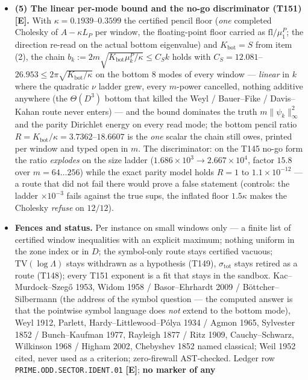 \documentclass[11pt]{article}
\providecommand{\mE}{\textbf{[E]}}\providecommand{\mC}{\textbf{[C]}}
\begin{document}
\begin{itemize}[leftmargin=1.5em]
violates the monotone shape on every window and the closed formula misses its minimum by
$\ge8.7\times10^{-2}$).
\item \textbf{(5) The linear per-mode bound and the no-go discriminator (T151) \mE.} With
$\kappa=0.1939$--$0.3599$ the certified pencil floor (\emph{one} completed Cholesky of
$A-\kappa L_P$ per window, the floating-point floor carried as $\mathrm{fl}/\mu^P_1$; the
direction re-read on the actual bottom eigenvalue) and $K_{\mathrm{bot}}=S$ from item (2), the
chain $b_k:=2m\sqrt{K_{\mathrm{bot}}\mu^P_k/\kappa}\le C_Sk$ holds with
$C_S=12.081$--$26.953\le2\pi\sqrt{K_{\mathrm{bot}}/\kappa}$ on the bottom $8$ modes of every
window --- \emph{linear} in $k$ where the quadratic $\nu$ ladder grew, every $m$-power
cancelled, nothing additive anywhere (the $\Theta(D^3)$ bottom that killed the Weyl /
Bauer--Fike / Davis--Kahan route never enters) --- and the bound dominates the truth
$m\|\psi_k\|_\infty^2$ and the parity Dirichlet energy on every read mode; the bottom pencil
ratio $R=K_{\mathrm{bot}}/\kappa=3.7362$--$18.6607$ is the \emph{one} scalar the chain still
owes, printed per window and typed open in $m$. The discriminator: on the T145 no-go form the
ratio \emph{explodes} on the size ladder ($1.686\times10^{3}\to2.667\times10^{4}$, factor
$15.8$ over $m=64\ldots256$) while the exact parity model holds $R=1$ to $1.1\times10^{-12}$
--- a route that did not fail there would prove a false statement (controls: the ladder
$\times10^{-3}$ fails against the true sups, the inflated floor $1.5\kappa$ makes the Cholesky
\emph{refuse} on $12/12$).
\item \textbf{Fences and status.} Per instance on small windows only --- a finite list of
certified window inequalities with an explicit maximum; nothing uniform in the zone index or
in $D$; the symbol-only route stays certified vacuous; $\mathrm{TV}(\log\Lambda)$ stays
withdrawn as a hypothesis (T149), $\sigma_{\mathrm{tot}}$ stays retired as a route (T148);
every T151 exponent is a fit that stays in the sandbox. Kac--Murdock--Szeg\H{o} 1953, Widom
1958 / Basor--Ehrhardt 2009 / B\"ottcher--Silbermann (the address of the symbol question ---
the computed answer is that the pointwise symbol language does \emph{not} extend to the bottom
mode), Weyl 1912, Parlett, Hardy--Littlewood--P\'olya 1934 / Agmon 1965, Sylvester 1852 /
Bunch--Kaufman 1977, Rayleigh 1877 / Ritz 1909, Cauchy--Schwarz, Wilkinson 1968 / Higham 2002,
Chebyshev 1852 named classical; Weil 1952 cited, never used as a criterion; zero-firewall
AST-checked. Ledger row \texttt{PRIME.ODD.SECTOR.IDENT.01} \mE; \textbf{no marker of any
}
\end{itemize}
\end{document}
